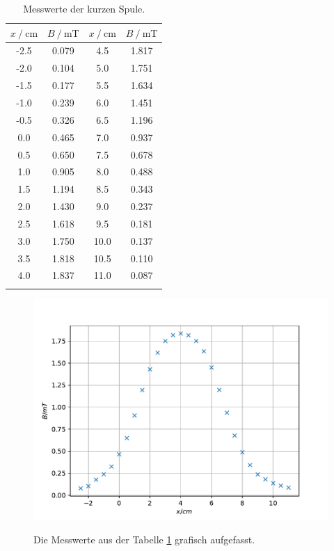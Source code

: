 \begin{table}
\centering
\caption{Messwerte der kurzen Spule.}
\begin{tabular}{cc|cc}
\toprule
$x \:/\: \si{\centi\meter}$ & $B \:/\: \si{\milli\tesla}$ &$x \:/\: \si{\centi\meter}$ & $B \:/\: \si{\milli\tesla}$ \\
\midrule
-2.5 & 0.079 & 4.5 & 1.817  \\
-2.0 & 0.104 & 5.0 & 1.751  \\
-1.5 & 0.177 & 5.5 & 1.634  \\
-1.0 & 0.239 & 6.0 & 1.451  \\
-0.5 & 0.326 & 6.5 & 1.196  \\
0.0 & 0.465  & 7.0 & 0.937  \\
0.5 & 0.650  & 7.5 & 0.678  \\
1.0 & 0.905  & 8.0 & 0.488  \\
1.5 & 1.194  &  8.5 & 0.343  \\
2.0 & 1.430  & 9.0 & 0.237  \\
2.5 & 1.618  & 9.5 & 0.181  \\
3.0 & 1.750  & 10.0 & 0.137 \\
3.5 & 1.818  & 10.5 & 0.110 \\
4.0 & 1.837  & 11.0 & 0.087 \\
\bottomrule
\label{tab:short}
\end{tabular}
\end{table}

\begin{figure}
  \centering
  \caption{Die Messwerte aus der Tabelle \ref{tab:short} grafisch aufgefasst.}
  \includegraphics[width=\textwidth]{content/data/plot_short.pdf}
  \label{fig:short}
\end{figure}

